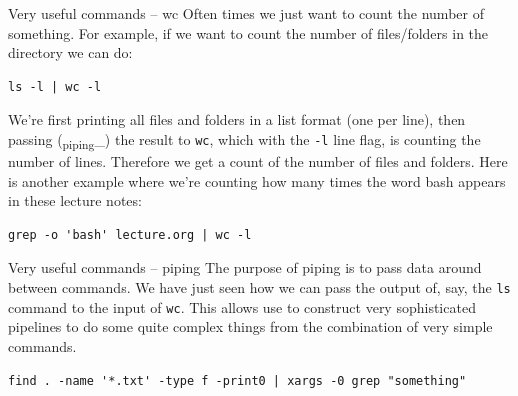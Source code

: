 \documentclass[10pt]{beamer}
\begin{document}
\begin{frame}[label={sec:orgf081129},fragile]{Very useful commands -- wc}
 Often times we just want to count the number of something. For example, if we
want to count the number of files/folders in the directory we can do:

\begin{verbatim}
ls -l | wc -l
\end{verbatim}

We're first printing all files and folders in a list format (one per line), then
passing (\textsubscript{piping}\_) the result to \texttt{wc}, which with the \texttt{-l} line flag, is counting the
number of lines. Therefore we get a count of the number of files and
folders. Here is another example where we're counting how many times the word
bash appears in these lecture notes:

\begin{verbatim}
grep -o 'bash' lecture.org | wc -l
\end{verbatim}
\end{frame}

\begin{frame}[label={sec:org9820f2a},fragile]{Very useful commands -- piping}
 The purpose of piping is to pass data around between commands. We have just seen
how we can pass the output of, say, the \texttt{ls} command to  the input of \texttt{wc}. This
allows use to construct very sophisticated pipelines to do some quite complex
things from the combination of very simple commands.

\begin{verbatim}
find . -name '*.txt' -type f -print0 | xargs -0 grep "something"
\end{verbatim}
\end{frame}
\end{document}
